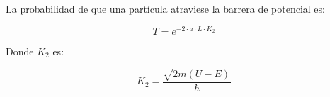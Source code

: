 \documentclass[a4paper]{article}
\begin{document}
            \indent La probabilidad de que una partícula atraviese la barrera de potencial es:

            \begin{equation}
                T = e^{-2 \cdot a \cdot L \cdot K_2}
            \end{equation}

            \indent Donde $K_2$ es:

            \begin{equation}
                K_2 = \frac{\sqrt{2m(U - E)}}{\hbar}
            \end{equation}
\end{document}
